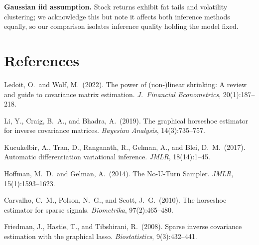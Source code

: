 \documentclass[11pt]{article}
\begin{document}
\textbf{Gaussian iid assumption.} Stock returns exhibit fat tails and volatility clustering; we acknowledge this but note it affects both inference methods equally, so our comparison isolates inference quality holding the model fixed.

\section*{References}
{\small
\begin{enumerate}[leftmargin=*,label={[\arabic*]},itemsep=1pt]
    \item Ledoit, O.\ and Wolf, M.\ (2022). The power of (non-)linear shrinking: A review and guide to covariance matrix estimation. \textit{J.\ Financial Econometrics}, 20(1):187--218.
    \item Li, Y., Craig, B.\ A., and Bhadra, A.\ (2019). The graphical horseshoe estimator for inverse covariance matrices. \textit{Bayesian Analysis}, 14(3):735--757.
    \item Kucukelbir, A., Tran, D., Ranganath, R., Gelman, A., and Blei, D.\ M.\ (2017). Automatic differentiation variational inference. \textit{JMLR}, 18(14):1--45.
    \item Hoffman, M.\ D.\ and Gelman, A.\ (2014). The No-U-Turn Sampler. \textit{JMLR}, 15(1):1593--1623.
    \item Carvalho, C.\ M., Polson, N.\ G., and Scott, J.\ G.\ (2010). The horseshoe estimator for sparse signals. \textit{Biometrika}, 97(2):465--480.
    \item Friedman, J., Hastie, T., and Tibshirani, R.\ (2008). Sparse inverse covariance estimation with the graphical lasso. \textit{Biostatistics}, 9(3):432--441.
\end{enumerate}
}
\end{document}
